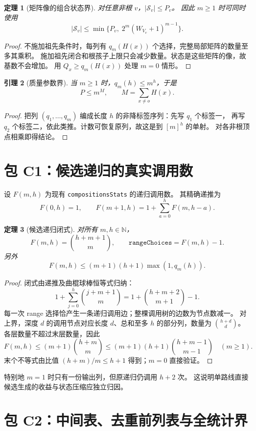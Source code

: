 \documentclass[UTF8,a4paper,11pt]{ctexart}
\newtheorem{theorem}{定理}[section]
\newtheorem{lemma}[theorem]{引理}
\theoremstyle{definition}
\newcommand{\N}{\mathbb N}
\begin{document}
\begin{theorem}[矩阵像的组合状态界]
对任意非根 $v$，$|\mathcal S_v|\le P_v$。
因此 $m\ge1$ 时可同时使用
\[
 |\mathcal S_v|\le
 \min\{P_v,\;2^m(W_{V_v}+1)^{m-1}\}.
\]
\end{theorem}
\begin{proof}
不施加祖先条件时，每列有 $q_m(H(x))$ 个选择，完整局部矩阵的数量至多其乘积。
施加祖先闭合和根孩子上限只会减少数量。状态是这些矩阵的像，故基数不会增加。
用 $Q_x\ge q_m(H(x))$ 处理 $m=0$ 情形。
\end{proof}

\begin{lemma}[质量参数界]
当 $m\ge1$ 时，$q_m(h)\le m^h$，于是
\[
 P\le m^M,\qquad M=\sum_{x\ne o}H(x).
\]
\end{lemma}
\begin{proof}
把列 $(q_1,\ldots,q_m)$ 编成长度 $h$ 的非降标签序列：先写 $q_1$ 个标签一，
再写 $q_2$ 个标签二，依此类推。计数可恢复原列，故这是到 $[m]^h$ 的单射。
对各非根顶点相乘即得结论。
\end{proof}

\section{包 C1：候选递归的真实调用数}

设 $F(m,h)$ 为现有 \texttt{compositionsStats} 的递归调用数。
其精确递推为
\[
 F(0,h)=1,\qquad F(m+1,h)=1+\sum_{a=0}^{h}F(m,h-a).
\]
\begin{theorem}[候选递归闭式]
对所有 $m,h\in\N$，
\[
 F(m,h)=\binom{h+m+1}{m},\qquad
 \texttt{rangeChoices}=F(m,h)-1.
\]
另外
\[
 F(m,h)\le (m+1)(h+1)\max(1,q_m(h)).
\]
\end{theorem}
\begin{proof}
闭式由递推及曲棍球棒恒等式归纳：
\[
 1+\sum_{j=0}^h\binom{j+m+1}{m}
 =1+\binom{h+m+2}{m+1}-1.
\]
每一次 range 选择恰产生一条递归调用边；整棵调用树的边数为节点数减一。
对上界，深度 $d$ 的调用节点对应长度 $d$、总和至多 $h$ 的部分列，数量为
$\binom{h+d}{d}$。各层数量不超过末层数量，因此
\[
 F(m,h)\le(m+1)\binom{h+m}{m}
 \le(m+1)(h+1)\binom{h+m-1}{m-1}\quad(m\ge1).
\]
末个不等式由比值 $(h+m)/m\le h+1$ 得到；$m=0$ 直接验证。
\end{proof}
特别地 $m=1$ 时只有一份输出列，但原递归仍调用 $h+2$ 次。
这说明单路线直接候选生成的收益与状态压缩应独立归因。

\section{包 C2：中间表、去重前列表与全统计界}
\end{document}
